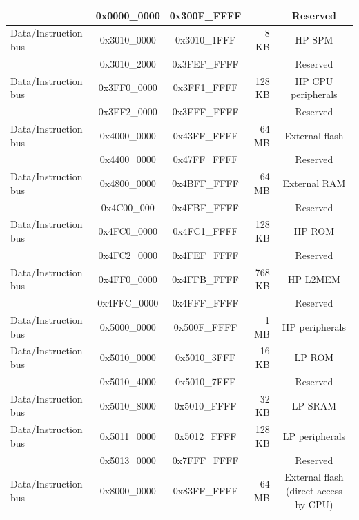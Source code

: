 \begin{ThreePartTable}
\begin{longtable}[c]{|p{3.5cm}|c|c|r|c| }
        \rowcolor{gray!25}  & 0x0000\_0000 & 0x300F\_FFFF &        & Reserved      \\\hline
        {Data/Instruction bus} & 0x3010\_0000 & 0x3010\_1FFF & 8 KB  & HP SPM  \\\hline
        \hline
        \rowcolor{gray!25}  & 0x3010\_2000 & 0x3FEF\_FFFF &         & Reserved      \\\hline
        {Data/Instruction bus} & 0x3FF0\_0000 & 0x3FF1\_FFFF & 128 KB  & HP CPU peripherals \\\hline
        \hline
        \rowcolor{gray!25}  & 0x3FF2\_0000 & 0x3FFF\_FFFF &         & Reserved      \\\hline
        {Data/Instruction bus} & 0x4000\_0000 & 0x43FF\_FFFF & 64 MB & External flash \\\hline
        \rowcolor{gray!25}  & 0x4400\_0000 & 0x47FF\_FFFF &         & Reserved      \\\hline
        {Data/Instruction bus} & 0x4800\_0000 & 0x4BFF\_FFFF & 64 MB  & External RAM \\\hline
        \rowcolor{gray!25}  & 0x4C00\_000 & 0x4FBF\_FFFF &         & Reserved      \\\hline
        {Data/Instruction bus} & 0x4FC0\_0000 & 0x4FC1\_FFFF & 128 KB  & HP ROM \\\hline
        \rowcolor{gray!25}  & 0x4FC2\_0000 & 0x4FEF\_FFFF &         & Reserved      \\\hline
        {Data/Instruction bus} & 0x4FF0\_0000 & 0x4FFB\_FFFF & 768 KB  & HP L2MEM \\\hline
        \rowcolor{gray!25}  & 0x4FFC\_0000 & 0x4FFF\_FFFF &         & Reserved      \\\hline
        {Data/Instruction bus} & 0x5000\_0000 & 0x500F\_FFFF & 1 MB  & HP peripherals \\\hline
        {Data/Instruction bus} & 0x5010\_0000 & 0x5010\_3FFF & 16 KB  & LP ROM \\\hline
        \rowcolor{gray!25}  & 0x5010\_4000 & 0x5010\_7FFF &         & Reserved      \\\hline
        {Data/Instruction bus} & 0x5010\_8000 & 0x5010\_FFFF & 32 KB  & LP SRAM \\\hline
        {Data/Instruction bus} & 0x5011\_0000 & 0x5012\_FFFF & 128 KB  & LP peripherals \\\hline
        \rowcolor{gray!25}  & 0x5013\_0000 & 0x7FFF\_FFFF &         & Reserved      \\\hline
        {Data/Instruction bus} & 0x8000\_0000 & 0x83FF\_FFFF & 64 MB  & External flash (direct access by CPU) \\\hline

\end{longtable}
\end{ThreePartTable}
